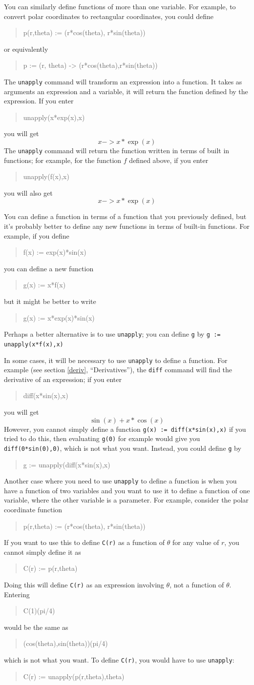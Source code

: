 \documentclass{article}
\newcommand{\xcasin}[1]
{\begin{quote}\ttfamily
#1
\end{quote}}
\newcommand{\xcasout}[1]
{\begin{equation*}
#1
\end{equation*}}
\begin{document}
You can similarly define functions of more than one variable.
For example, to convert polar coordinates to rectangular coordinates,
you could define
\xcasin{p(r,theta) := (r*cos(theta), r*sin(theta))}
or equivalently
\xcasin{p := (r, theta) -> (r*cos(theta),r*sin(theta))}

The \texttt{unapply} command will transform an expression into a
function.  It takes as arguments an expression and a variable, it will
return the function defined by the expression.  If you enter
\xcasin{unapply(x*exp(x),x)}
you will get
\xcasout{x ->x*\exp(x)}
The \texttt{unapply} command will return the function written in terms
of built in functions; for example, for the function $f$ defined
above, if you enter
\xcasin{unapply(f(x),x)}
you will also get
\xcasout{x ->x*\exp(x)}

You can define a function in terms of a function that you previously
defined, but it's probably better to define any new functions in
terms of built-in functions.   For example, if you define
\xcasin{f(x) := exp(x)*sin(x)}
you can define a new function
\xcasin{g(x) := x*f(x)}
but it might be better to write
\xcasin{g(x) := x*exp(x)*sin(x)}
Perhaps a better alternative is to use \texttt{unapply}; you can
define \texttt{g} by
\texttt{g := unapply(x*f(x),x)}

In some cases, it will be necessary to use \texttt{unapply} to define
a function.  For example (see section \ref{deriv}, ``Derivatives''),
the \texttt{diff} command will
find the derivative of an expression; if you enter
\xcasin{diff(x*sin(x),x)}
you will get
\xcasout{\sin(x) + x * \cos(x)}
However, you cannot simply define a function
\texttt{g(x) := diff(x*sin(x),x)}
if you tried to do this, then evaluating \texttt{g(0)} for example
would give you \texttt{diff(0*sin(0),0)}, which is not what you want.
Instead, you could define \texttt{g} by
\xcasin{g := unapply(diff(x*sin(x),x)}

Another case where you need to use \texttt{unapply} to define a
function is when you have a function of two variables and you want to
use it to define a function of one variable, where the other variable
is a parameter.  For example, consider the polar coordinate function
\xcasin{p(r,theta) := (r*cos(theta), r*sin(theta))}
If you want to use this to define \texttt{C(r)} as a function of
$\theta$ for any value of $r$, you cannot simply define it as
\xcasin{C(r) := p(r,theta)}
Doing this will define \texttt{C(r)} as an expression involving
$\theta$, not a function of $\theta$.  Entering
\xcasin{C(1)(pi/4)}
would be the same as
\xcasin{(cos(theta),sin(theta))(pi/4)}
which is not what you want.   To define \texttt{C(r)}, you
would have to use \texttt{unapply}:
\xcasin{C(r) := unapply(p(r,theta),theta)}
\end{document}
